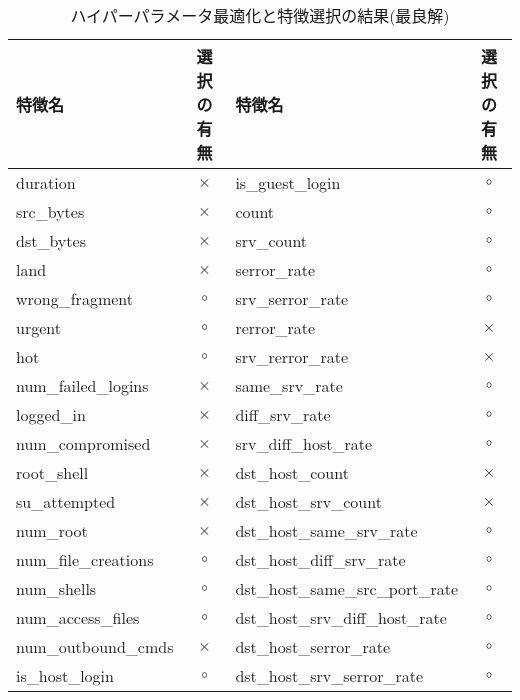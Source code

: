   \begin{table}[htbp]
  \setlength{\tabcolsep}{2pt} %
  \renewcommand{\arraystretch}{0.8} %
  \centering
  \caption{ハイパーパラメータ最適化と特徴選択の結果(最良解)}
  \begin{tabular}{|l|c|l|c|}
      \hline
      特徴名 & 選択の有無 & 特徴名 & 選択の有無   \\
      \hline
      duration & \(\times\) & is\_guest\_login & \(\circ\) \\
      \hline
      src\_bytes & \(\times\) & count & \(\circ\)  \\
      \hline
      dst\_bytes & \(\times\) & srv\_count & \(\circ\) \\
      \cline{1-4} %
      land & \(\times\) & serror\_rate & \(\circ\)  \\
      \cline{1-4} %
      wrong\_fragment & \(\circ\) & srv\_serror\_rate & \(\circ\)  \\
      \cline{1-4} %
      urgent & \(\circ\) & rerror\_rate & \(\times\)   \\
      \cline{1-4} %
      hot & \(\circ\) & srv\_rerror\_rate & \(\times\)   \\
      \cline{1-4} %
      num\_failed\_logins & \(\times\) & same\_srv\_rate & \(\circ\)   \\
      \cline{1-4} %
      logged\_in & \(\times\) & diff\_srv\_rate & \(\circ\)   \\
      \cline{1-4} %
      num\_compromised & \(\times\) & srv\_diff\_host\_rate & \(\circ\)   \\
      \cline{1-4} %
      root\_shell & \(\times\) & dst\_host\_count & \(\times\)   \\
      \cline{1-4} %
      su\_attempted & \(\times\) & dst\_host\_srv\_count & \(\times\)   \\
      \cline{1-4} %
      num\_root & \(\times\) & dst\_host\_same\_srv\_rate & \(\circ\)   \\
      \cline{1-4} %
      num\_file\_creations & \(\circ\) & dst\_host\_diff\_srv\_rate & \(\circ\)   \\
      \cline{1-4} %
      num\_shells & \(\circ\) & dst\_host\_same\_src\_port\_rate & \(\circ\)   \\
      \cline{1-4} %
      num\_access\_files & \(\circ\) & dst\_host\_srv\_diff\_host\_rate & \(\circ\)   \\
      \cline{1-4} %
      num\_outbound\_cmds & \(\times\) & dst\_host\_serror\_rate & \(\circ\)   \\
      \cline{1-4} %
      is\_host\_login & \(\circ\) & dst\_host\_srv\_serror\_rate & \(\circ\)   \\
      \cline{1-4} %
  \end{tabular}
\end{table}
